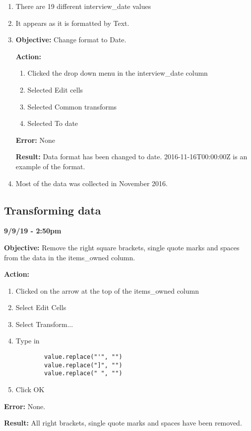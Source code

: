 \documentclass{article}
\begin{document}
\begin{enumerate}
    \item There are 19 different interview\_date values
    \item It appears as it is formatted by Text.
    \item \textbf{Objective:} Change format to Date.
    
    \textbf{Action:}
    \begin{enumerate}
        \item Clicked the drop down menu in the interview\_date column
        \item Selected Edit cells
        \item Selected Common transforms
        \item Selected To date
    \end{enumerate}
    
    \textbf{Error:} None
    
    \textbf{Result:} Data format has been changed to date. 2016-11-16T00:00:00Z is an example of the format.
    \item Most of the data was collected in November 2016.
\end{enumerate}

\subsection{Transforming data}

\textbf{9/9/19 - 2:50pm}

\textbf{Objective:} Remove the right square brackets, single quote marks and spaces from the data in the items\_owned column.

\textbf{Action:}

\begin{enumerate}
    \item Clicked on the arrow at the top of the items\_owned column
    \item Select Edit Cells
    \item Select Transform...
    \item Type in \begin{verbatim}
        value.replace("'", "")
        value.replace("]", "")
        value.replace(" ", "")
    \end{verbatim}
    \item Click OK
\end{enumerate}

\textbf{Error:} None.

\textbf{Result:} All right brackets, single quote marks and spaces have been removed.
\end{document}
